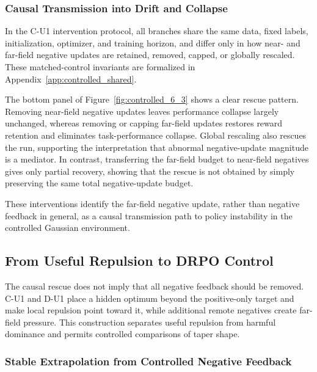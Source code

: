 \documentclass[sigconf,anonymous,review]{acmart}
\theoremstyle{acmdefinition}
\begin{document}
\subsubsection{Causal Transmission into Drift and Collapse}
\label{sec:controlled_transmission}

In the C-U1 intervention protocol, all branches share the
same data, fixed labels, initialization, optimizer, and training horizon,
and differ only in how near- and far-field negative updates are retained,
removed, capped, or globally rescaled. These matched-control invariants are
formalized in Appendix~\ref{app:controlled_shared}.

The bottom panel of Figure~\ref{fig:controlled_6_3} shows a clear rescue
pattern. Removing near-field negative updates leaves performance collapse
largely unchanged, whereas removing or capping far-field updates restores
reward retention and eliminates task-performance collapse. Global
rescaling also rescues the run, supporting the interpretation that
abnormal negative-update magnitude is a mediator. In contrast,
transferring the far-field budget to near-field negatives gives only
partial recovery, showing that the rescue is not obtained by simply
preserving the same total negative-update budget.

These interventions identify the far-field negative update, rather than
negative feedback in general, as a causal transmission path to policy
instability in the controlled Gaussian environment.

\subsection{From Useful Repulsion to DRPO Control}
\label{sec:repulsion_control}

The causal rescue does not imply that all negative feedback should be removed.
C-U1 and D-U1 place a hidden optimum beyond the positive-only target and make
local repulsion point toward it, while additional remote negatives create
far-field pressure. This construction separates useful repulsion from harmful
dominance and permits controlled comparisons of taper shape.

\subsubsection{Stable Extrapolation from Controlled Negative Feedback}
\label{sec:controlled_negative_strength}
\end{document}
